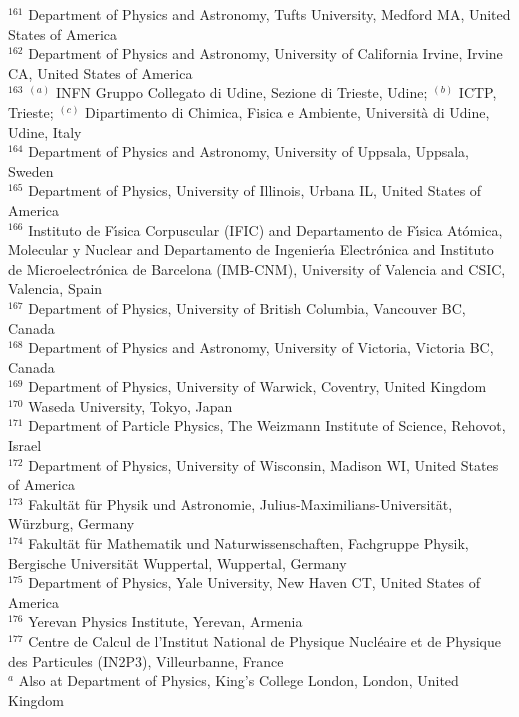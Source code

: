 \begin{flushleft}
$^{161}$ Department of Physics and Astronomy, Tufts University, Medford MA, United States of America\\
$^{162}$ Department of Physics and Astronomy, University of California Irvine, Irvine CA, United States of America\\
$^{163}$ $^{(a)}$ INFN Gruppo Collegato di Udine, Sezione di Trieste, Udine; $^{(b)}$ ICTP, Trieste; $^{(c)}$ Dipartimento di Chimica, Fisica e Ambiente, Universit{\`a} di Udine, Udine, Italy\\
$^{164}$ Department of Physics and Astronomy, University of Uppsala, Uppsala, Sweden\\
$^{165}$ Department of Physics, University of Illinois, Urbana IL, United States of America\\
$^{166}$ Instituto de F{\'\i}sica Corpuscular (IFIC) and Departamento de F{\'\i}sica At{\'o}mica, Molecular y Nuclear and Departamento de Ingenier{\'\i}a Electr{\'o}nica and Instituto de Microelectr{\'o}nica de Barcelona (IMB-CNM), University of Valencia and CSIC, Valencia, Spain\\
$^{167}$ Department of Physics, University of British Columbia, Vancouver BC, Canada\\
$^{168}$ Department of Physics and Astronomy, University of Victoria, Victoria BC, Canada\\
$^{169}$ Department of Physics, University of Warwick, Coventry, United Kingdom\\
$^{170}$ Waseda University, Tokyo, Japan\\
$^{171}$ Department of Particle Physics, The Weizmann Institute of Science, Rehovot, Israel\\
$^{172}$ Department of Physics, University of Wisconsin, Madison WI, United States of America\\
$^{173}$ Fakult{\"a}t f{\"u}r Physik und Astronomie, Julius-Maximilians-Universit{\"a}t, W{\"u}rzburg, Germany\\
$^{174}$ Fakult{\"a}t f{\"u}r Mathematik und Naturwissenschaften, Fachgruppe Physik, Bergische Universit{\"a}t Wuppertal, Wuppertal, Germany\\
$^{175}$ Department of Physics, Yale University, New Haven CT, United States of America\\
$^{176}$ Yerevan Physics Institute, Yerevan, Armenia\\
$^{177}$ Centre de Calcul de l'Institut National de Physique Nucl{\'e}aire et de Physique des Particules (IN2P3), Villeurbanne, France\\
$^{a}$ Also at Department of Physics, King's College London, London, United Kingdom\\

\end{flushleft}
